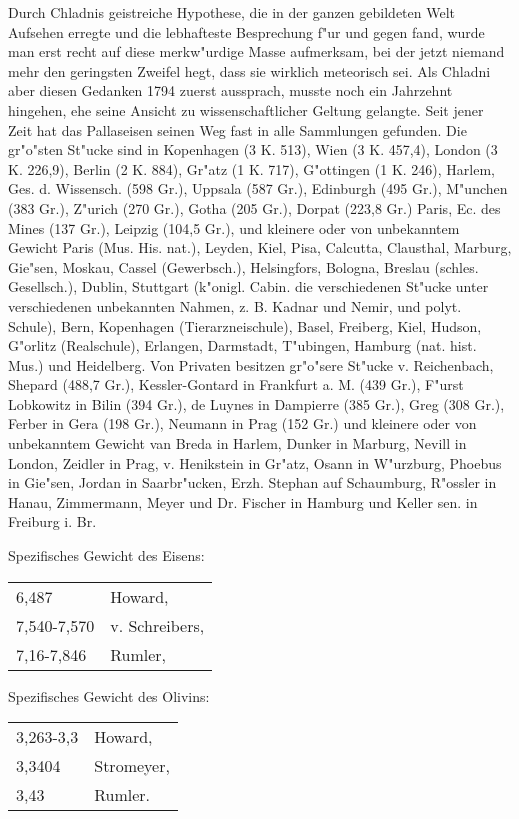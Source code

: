 \documentclass[a4paper, 11pt, oneside]{article}
\begin{document}
Durch Chladnis geistreiche Hypothese, die in der ganzen gebildeten Welt Aufsehen erregte und die lebhafteste Besprechung f"ur und gegen fand, wurde man erst recht auf diese merkw"urdige Masse aufmerksam, bei der jetzt niemand mehr den geringsten Zweifel hegt, dass sie wirklich meteorisch sei. Als Chladni aber diesen Gedanken 1794 zuerst aussprach, musste noch ein Jahrzehnt hingehen, ehe seine Ansicht zu wissenschaftlicher Geltung gelangte. Seit jener Zeit hat das Pallaseisen seinen Weg fast in alle Sammlungen gefunden. Die gr"o"sten St"ucke sind in Kopenhagen (3 K. 513), Wien (3 K. 457,4), London (3 K. 226,9), Berlin (2 K. 884), Gr"atz (1 K. 717), G"ottingen (1 K. 246), Harlem, Ges. d. Wissensch. (598 Gr.), Uppsala (587 Gr.), Edinburgh (495 Gr.), M"unchen (383 Gr.), Z"urich (270 Gr.), Gotha (205 Gr.), Dorpat (223,8 Gr.) Paris, Ec. des Mines (137 Gr.), Leipzig (104,5 Gr.), und kleinere oder von unbekanntem Gewicht Paris (Mus. His. nat.), Leyden, Kiel, Pisa, Calcutta, Clausthal, Marburg, Gie"sen, Moskau, Cassel (Gewerbsch.), Helsingfors, Bologna, Breslau (schles. Gesellsch.), Dublin, Stuttgart (k"onigl. Cabin. die verschiedenen St"ucke unter verschiedenen unbekannten Nahmen, z. B. Kadnar und Nemir, und polyt. Schule), Bern, Kopenhagen (Tierarzneischule), Basel, Freiberg, Kiel, Hudson, G"orlitz (Realschule), Erlangen, Darmstadt, T"ubingen, Hamburg (nat. hist. Mus.) und Heidelberg. Von Privaten besitzen gr"o"sere St"ucke v. Reichenbach, Shepard (488,7 Gr.), Kessler-Gontard in Frankfurt a. M. (439 Gr.), F"urst Lobkowitz in Bilin (394 Gr.), de Luynes in Dampierre (385 Gr.), Greg (308 Gr.), Ferber in Gera (198 Gr.), Neumann in Prag (152 Gr.) und kleinere oder von unbekanntem Gewicht van Breda in Harlem, Dunker in Marburg, Nevill in London, Zeidler in Prag, v. Henikstein in Gr"atz, Osann in W"urzburg, Phoebus in Gie"sen, Jordan in Saarbr"ucken, Erzh. Stephan auf Schaumburg, R"ossler in Hanau, Zimmermann, Meyer und Dr. Fischer in Hamburg und Keller sen. in Freiburg i. Br.

Spezifisches Gewicht des Eisens:  
\begin{table}[!ht]
    \centering\swabfamily\Large
    \begin{tabular}{l l}
        6,487 & Howard,\\
        7,540-7,570 & v. Schreibers,\\
        7,16-7,846 & Rumler,
    \end{tabular}
\end{table}

Spezifisches Gewicht des Olivins:  
\begin{table}[!ht]
    \centering\swabfamily\Large
    \begin{tabular}{l l}
        3,263-3,3 & Howard,\\
        3,3404 & Stromeyer,\\
        3,43 & Rumler.
    \end{tabular}
\end{table}
\end{document}
